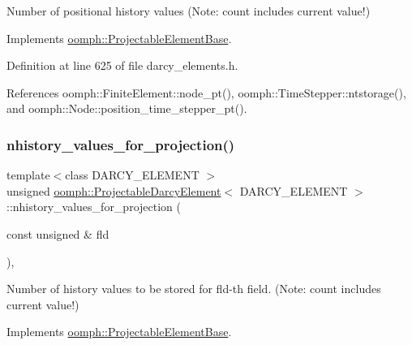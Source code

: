 Number of positional history values (Note\+: count includes current value!) 



Implements \hyperlink{classoomph_1_1ProjectableElementBase_ab4ecd0cd24000a3ed675dc7198203c1f}{oomph\+::\+Projectable\+Element\+Base}.



Definition at line 625 of file darcy\+\_\+elements.\+h.



References oomph\+::\+Finite\+Element\+::node\+\_\+pt(), oomph\+::\+Time\+Stepper\+::ntstorage(), and oomph\+::\+Node\+::position\+\_\+time\+\_\+stepper\+\_\+pt().

\mbox{\label{classoomph_1_1ProjectableDarcyElement_aba5e9617dc6346ca4318baf457445da9}} 
\subsubsection{\texorpdfstring{nhistory\+\_\+values\+\_\+for\+\_\+projection()}{nhistory\_values\_for\_projection()}}
{\footnotesize\ttfamily template$<$class D\+A\+R\+C\+Y\+\_\+\+E\+L\+E\+M\+E\+NT $>$ \\
unsigned \hyperlink{classoomph_1_1ProjectableDarcyElement}{oomph\+::\+Projectable\+Darcy\+Element}$<$ D\+A\+R\+C\+Y\+\_\+\+E\+L\+E\+M\+E\+NT $>$\+::nhistory\+\_\+values\+\_\+for\+\_\+projection (\begin{DoxyParamCaption}\item[{const unsigned \&}]{fld }\end{DoxyParamCaption})\hspace{0.3cm}{\ttfamily [inline]}, {\ttfamily [virtual]}}



Number of history values to be stored for fld-\/th field. (Note\+: count includes current value!) 



Implements \hyperlink{classoomph_1_1ProjectableElementBase_ac6790f394630b964663281f8740f43a5}{oomph\+::\+Projectable\+Element\+Base}.




